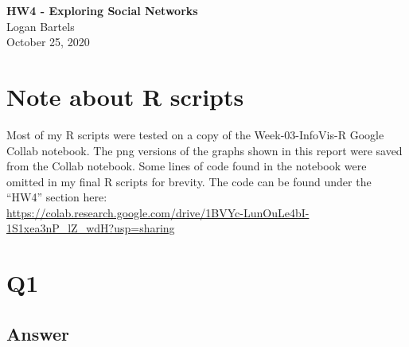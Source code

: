 \documentclass[12pt]{article}
\begin{document}
\begin{centering}
{\large\textbf{HW4 - Exploring Social Networks}}\\ %
Logan Bartels\\                     %
October 25, 2020\\                      %
\end{centering}


\section*{Note about R scripts}
Most of my R scripts were tested on a copy of the Week-03-InfoVis-R Google Collab notebook.  The png versions of the graphs shown in this report were saved from the Collab notebook.  Some lines of code found in the notebook were omitted in my final R scripts for brevity.  The code can be found under the ``HW4'' section here:\\
\url{https://colab.research.google.com/drive/1BVYc-LunOuLe4bI-1S1xea3nP_lZ_wdH?usp=sharing}

\section*{Q1}



\subsection*{Answer}






\end{document}
